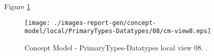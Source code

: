 Figure \ref{fig:lu.uni.lassy.excalibur.examples.icrash-CM-view-local-PrimaryTypes-Datatypes-08} 



\begin{figure}[htbp] 
\label{fig:lu.uni.lassy.excalibur.examples.icrash-CM}
\begin{center}
\texttt{[image: ./images-report-gen/concept-model/local/PrimaryTypes-Datatypes/08/cm-view8.eps]}
\end{center}
\caption[Concept Model - PrimaryTypes-Datatypes local view 08 - ]{Concept Model - PrimaryTypes-Datatypes local view 08. .}
\label{fig:lu.uni.lassy.excalibur.examples.icrash-CM-view-local-PrimaryTypes-Datatypes-08}
\end{figure}
\vspace{0.5cm} 
